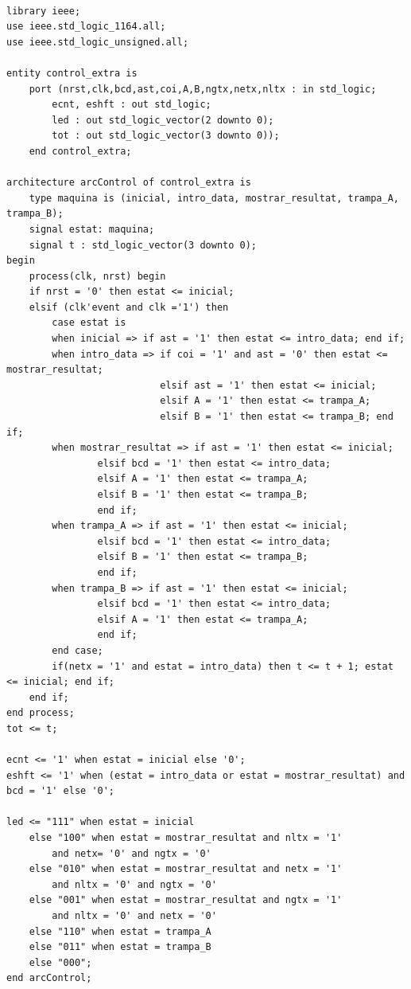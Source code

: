 \documentclass[12pt, a4papre]{article}
\begin{document}
	\begin{lstlisting}[style=vhdl, frame=single, basicstyle=\tiny]

library ieee;
use ieee.std_logic_1164.all;
use ieee.std_logic_unsigned.all;

entity control_extra is
	port (nrst,clk,bcd,ast,coi,A,B,ngtx,netx,nltx : in std_logic;
		ecnt, eshft : out std_logic;
		led : out std_logic_vector(2 downto 0);
		tot : out std_logic_vector(3 downto 0));
	end control_extra;

architecture arcControl of control_extra is 
	type maquina is (inicial, intro_data, mostrar_resultat, trampa_A, trampa_B);
	signal estat: maquina;
	signal t : std_logic_vector(3 downto 0);
begin
	process(clk, nrst) begin
	if nrst = '0' then estat <= inicial;
	elsif (clk'event and clk ='1') then
	    case estat is 
	    when inicial => if ast = '1' then estat <= intro_data; end if;
	    when intro_data => if coi = '1' and ast = '0' then estat <= mostrar_resultat;
						   elsif ast = '1' then estat <= inicial;
						   elsif A = '1' then estat <= trampa_A;
						   elsif B = '1' then estat <= trampa_B; end if;
	    when mostrar_resultat => if ast = '1' then estat <= inicial;
				elsif bcd = '1' then estat <= intro_data;
				elsif A = '1' then estat <= trampa_A;
				elsif B = '1' then estat <= trampa_B;
				end if;
		when trampa_A => if ast = '1' then estat <= inicial;
				elsif bcd = '1' then estat <= intro_data;
				elsif B = '1' then estat <= trampa_B;
				end if;
		when trampa_B => if ast = '1' then estat <= inicial;
				elsif bcd = '1' then estat <= intro_data;
				elsif A = '1' then estat <= trampa_A;
				end if;
		end case;
		if(netx = '1' and estat = intro_data) then t <= t + 1; estat <= inicial; end if;
	end if;
end process;
tot <= t;

ecnt <= '1' when estat = inicial else '0';
eshft <= '1' when (estat = intro_data or estat = mostrar_resultat) and bcd = '1' else '0';
			
led <= "111" when estat = inicial 
    else "100" when estat = mostrar_resultat and nltx = '1' 
        and netx= '0' and ngtx = '0'
    else "010" when estat = mostrar_resultat and netx = '1' 
    	and nltx = '0' and ngtx = '0'
    else "001" when estat = mostrar_resultat and ngtx = '1' 
    	and nltx = '0' and netx = '0'
    else "110" when estat = trampa_A
    else "011" when estat = trampa_B
    else "000";
end arcControl;

			\end{lstlisting}
			
			
			
\end{document}
